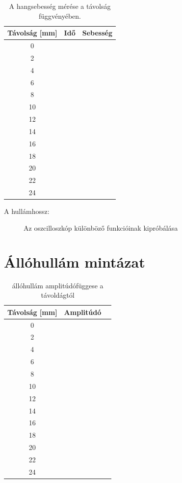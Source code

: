 \documentclass{article}
\begin{document}
\begin{table}[h!]
    \centering
    \begin{tabular}{|c|c|c|}
        \hline
        Távolság [mm] & Idő & Sebesség \\ \hline
        0 & & \\ \hline
        2 & & \\ \hline
        4 & & \\ \hline
        6 & & \\ \hline
        8 & & \\ \hline
        10 & & \\ \hline
        12 & & \\ \hline
        14 & & \\ \hline
        16 & & \\ \hline
        18 & & \\ \hline
        20 & & \\ \hline
        22 & & \\ \hline
        24 & & \\ \hline
    \end{tabular}
    \caption{A hangsebesség mérése a távolság függvényében.}
    \label{tab:hangsebesseg_meres}
\end{table}

A hullámhossz:

\begin{figure}[htp]
    \centering
    \caption{Az oszcilloszkóp különböző funkcióinak kipróbálása}
    \label{hangsebesség_grafikon}
\end{figure}


\section{Állóhullám mintázat}



\begin{table}[h!]
    \centering
    \begin{tabular}{|c|c|c|}
        \hline
        Távolság [mm] & Amplitúdó \\ \hline
        0 &  \\ \hline
        2 &  \\ \hline
        4 &  \\ \hline
        6 &  \\ \hline
        8 &  \\ \hline
        10 &  \\ \hline
        12 &  \\ \hline
        14 &  \\ \hline
        16 &  \\ \hline
        18 &  \\ \hline
        20 &  \\ \hline
        22 &  \\ \hline
        24 &  \\ \hline
    \end{tabular}
    \caption{állóhullám amplitúdófüggese a távoldágtól}
    \label{állóhullám}
\end{table}
\end{document}
